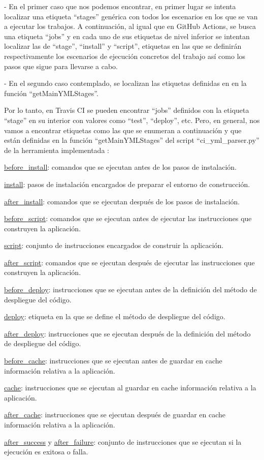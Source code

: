 - En el primer caso que nos podemos encontrar, en primer lugar se intenta localizar una etiqueta ``stages'' genérica con todos los escenarios en los que se van a ejecutar los trabajos. A continuación, al igual que en GitHub Actions, se busca una etiqueta ``jobs'' y en cada uno de sus etiquetas de nivel inferior se intentan localizar las de ``stage'', ``install'' y ``script'', etiquetas en las que se definirán respectivamente los escenarios de ejecución concretos del trabajo así como los pasos que sigue para llevarse a cabo.

- En el segundo caso contemplado, se localizan las etiquetas definidas en en la función ``getMainYMLStages''.

Por lo tanto, en Travis CI se pueden encontrar ``jobs'' definidos con la etiqueta ``stage'' en su interior con valores como ``test'', ``deploy'', etc. Pero, en general, nos vamos a encontrar etiquetas como las que se enumeran a continuación y que están definidas en la función ``getMainYMLStages'' del script ``ci\_yml\_parser.py'' de la herramienta implementada \cite{stagesTravisCI}:
\begin{compactitem}
    \item \underline{before\_install}: comandos que se ejecutan antes de los pasos de instalación.
    \item \underline{install}: pasos de instalación encargados de preparar el entorno de construcción.
    \item \underline{after\_install}: comandos que se ejecutan después de los pasos de instalación.
    \item \underline{before\_script}: comandos que se ejecutan antes de ejecutar las instrucciones que construyen la aplicación.
    \item \underline{script}: conjunto de instrucciones encargados de construir la aplicación.
    \item \underline{after\_script}: comandos que se ejecutan después de ejecutar las instrucciones que construyen la aplicación.
    \item \underline{before\_deploy}: instrucciones que se ejecutan antes de la definición del método de despliegue del código.
    \item \underline{deploy}: etiqueta en la que se define el método de despliegue del código.
    \item \underline{after\_deploy}: instrucciones que se ejecutan después de la definición del método de despliegue del código.
    \item \underline{before\_cache}: instrucciones que se ejecutan antes de guardar en cache información relativa a la aplicación.
    \item \underline{cache}: instrucciones que se ejecutan al guardar en cache información relativa a la aplicación.
    \item \underline{after\_cache}: instrucciones que se ejecutan después de guardar en cache información relativa a la aplicación.
    \item \underline{after\_success} y \underline{after\_failure}: conjunto de instrucciones que se ejecutan si la ejecución es exitosa o falla.
\end{compactitem} 

